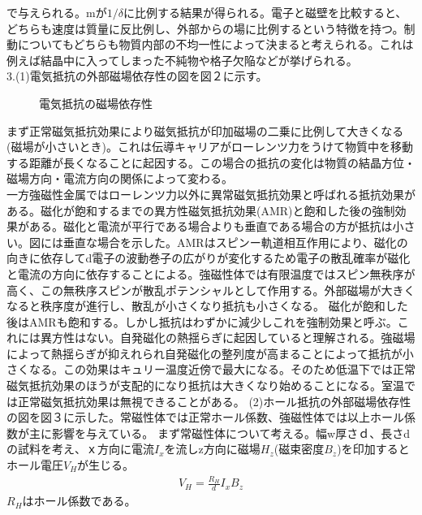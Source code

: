 \documentclass{jsarticle}
\begin{document}
で与えられる。mが$1/\delta$に比例する結果が得られる。電子と磁壁を比較すると、どちらも速度は質量に反比例し、外部からの場に比例するという特徴を持つ。制動についてもどちらも物質内部の不均一性によって決まると考えられる。これは例えば結晶中に入ってしまった不純物や格子欠陥などが挙げられる。\\
3.(1)電気抵抗の外部磁場依存性の図を図２に示す。
\begin{figure}[htbp]
\begin{center}
 \end{center}
 \caption{電気抵抗の磁場依存性}
 \label{fig:one}
\end{figure}
まず正常磁気抵抗効果により磁気抵抗が印加磁場の二乗に比例して大きくなる(磁場が小さいとき)。これは伝導キャリアがローレンツ力をうけて物質中を移動する距離が長くなることに起因する。この場合の抵抗の変化は物質の結晶方位・磁場方向・電流方向の関係によって変わる。\\
\quad 一方強磁性金属ではローレンツ力以外に異常磁気抵抗効果と呼ばれる抵抗効果がある。磁化が飽和するまでの異方性磁気抵抗効果(AMR)と飽和した後の強制効果がある。磁化と電流が平行である場合よりも垂直である場合の方が抵抗は小さい。図には垂直な場合を示した。AMRはスピンー軌道相互作用により、磁化の向きに依存してd電子の波動巻子の広がりが変化するため電子の散乱確率が磁化と電流の方向に依存することによる。強磁性体では有限温度ではスピン無秩序が高く、この無秩序スピンが散乱ポテンシャルとして作用する。外部磁場が大きくなると秩序度が進行し、散乱が小さくなり抵抗も小さくなる。
\quad 磁化が飽和した後はAMRも飽和する。しかし抵抗はわずかに減少しこれを強制効果と呼ぶ。これには異方性はない。自発磁化の熱揺らぎに起因していると理解される。強磁場によって熱揺らぎが抑えれられ自発磁化の整列度が高まることによって抵抗が小さくなる。この効果はキュリー温度近傍で最大になる。そのため低温下では正常磁気抵抗効果のほうが支配的になり抵抗は大きくなり始めることになる。室温では正常磁気抵抗効果は無視できることがある。
(2)ホール抵抗の外部磁場依存性の図を図３に示した。常磁性体では正常ホール係数、強磁性体では以上ホール係数が主に影響を与えている。
まず常磁性体について考える。幅w厚さｄ、長さdの試料を考え、ｘ方向に電流$I_x$を流しz方向に磁場$H_z$(磁束密度$B_z$)を印加するとホール電圧$V_H$が生じる。
\begin{align}
V_H=\frac{R_H}{d}I_xB_z
\end{align}
$R_H$はホール係数である。
\end{document}
